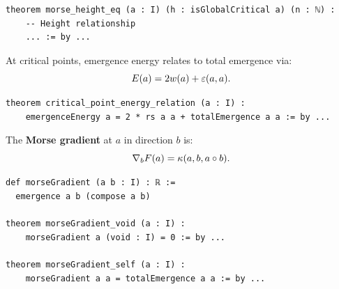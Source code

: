 \begin{lstlisting}[caption={Morse height (IDT\_v3\_Emergence.lean)}]
theorem morse_height_eq (a : I) (h : isGlobalCritical a) (n : ℕ) :
    -- Height relationship
    ... := by ...
\end{lstlisting}

\begin{theorem}
\label{thm:critical-energy-relation}
At critical points, emergence energy relates to total emergence via:
\[
  E(a) = 2w(a) + \varepsilon(a,a).
\]
\end{theorem}

\begin{lstlisting}[caption={Critical energy (IDT\_v3\_Emergence.lean)}]
theorem critical_point_energy_relation (a : I) :
    emergenceEnergy a = 2 * rs a a + totalEmergence a a := by ...
\end{lstlisting}

\begin{definition}
\label{def:morse-gradient}
The \textbf{Morse gradient} at $a$ in direction $b$ is:
\[
  \nabla_b F(a) = \kappa(a, b, a \circ b).
\]
\end{definition}

\begin{lstlisting}[caption={Morse gradient (IDT\_v3\_Emergence.lean)}]
def morseGradient (a b : I) : ℝ :=
  emergence a b (compose a b)

theorem morseGradient_void (a : I) :
    morseGradient a (void : I) = 0 := by ...

theorem morseGradient_self (a : I) :
    morseGradient a a = totalEmergence a a := by ...
\end{lstlisting}

